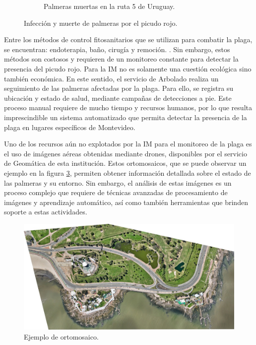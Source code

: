 \begin{figure}[!htpb]
\begin{subfigure}[b]{0.49\textwidth}
    \caption{Palmeras muertas en la ruta 5 de Uruguay.} 
    \label{fig:palmeras-ruta5}
  \end{subfigure}
  \caption{Infección y muerte de palmeras por el picudo rojo.}
  \label{fig:infeccion-y-muerte-palmeras}
\end{figure}

Entre los métodos de control fitosanitarios que se utilizan para combatir la plaga, se encuentran: endoterapia, baño, cirugía y remoción. . Sin embargo, estos métodos son costosos y requieren de un monitoreo constante para detectar la presencia del picudo rojo. Para la IM no es solamente una cuestión ecológica sino también económica. En este sentido, el servicio de Arbolado realiza un seguimiento de las palmeras afectadas por la plaga. Para ello, se registra su ubicación y estado de salud, mediante campañas de detecciones a pie. Este proceso manual requiere de mucho tiempo y recursos humanos, por lo que resulta imprescindible un sistema automatizado que permita detectar la presencia de la plaga en lugares específicos de Montevideo.

Uno de los recursos aún no explotados por la IM para el monitoreo de la plaga es el uso de imágenes aéreas obtenidas mediante drones, disponibles por el servicio de Geomática de esta institución. Estos ortomosaicos, que se puede observar un ejemplo en la figura \ref{fig:ejemplo-ortomosaico}, permiten obtener información detallada sobre el estado de las palmeras y su entorno. Sin embargo, el análisis de estas imágenes es un proceso complejo que requiere de técnicas avanzadas de procesamiento de imágenes y aprendizaje automático, así como también herramientas que brinden soporte a estas actividades.

\begin{figure}[H]
  \centering
  \includegraphics[scale=0.3]{./Figures/ejemplo-ortomosaico.jpg}
  \caption{Ejemplo de ortomosaico\protect\footnotemark.}
  \label{fig:ejemplo-ortomosaico}
\end{figure}

